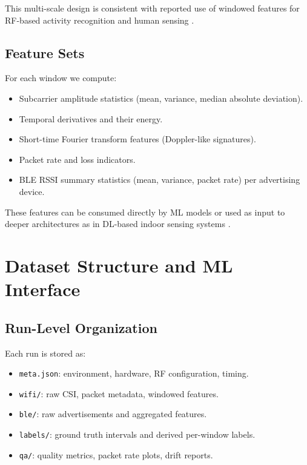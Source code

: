 \documentclass[11pt,a4paper]{article}
\begin{document}
This multi-scale design is consistent with reported use of windowed features for RF-based activity recognition and human sensing \cite{shahbazian2023human,abdelbasset2021indoor}.

\subsection{Feature Sets}

For each window we compute:

\begin{itemize}[leftmargin=*]
\item Subcarrier amplitude statistics (mean, variance, median absolute deviation).
\item Temporal derivatives and their energy.
\item Short-time Fourier transform features (Doppler-like signatures).
\item Packet rate and loss indicators.
\item BLE RSSI summary statistics (mean, variance, packet rate) per advertising device.
\end{itemize}

These features can be consumed directly by ML models or used as input to deeper architectures as in DL-based indoor sensing systems \cite{abdelbasset2021indoor}.

\section{Dataset Structure and ML Interface}

\subsection{Run-Level Organization}

Each run is stored as:

\begin{itemize}[leftmargin=*]
\item \texttt{meta.json}: environment, hardware, RF configuration, timing.
\item \texttt{wifi/}: raw CSI, packet metadata, windowed features.
\item \texttt{ble/}: raw advertisements and aggregated features.
\item \texttt{labels/}: ground truth intervals and derived per-window labels.
\item \texttt{qa/}: quality metrics, packet rate plots, drift reports.
\end{itemize}
\end{document}
